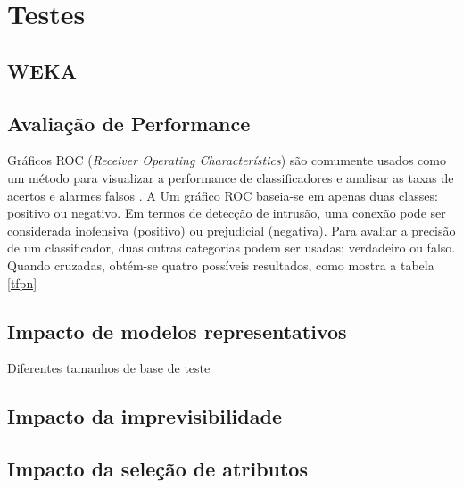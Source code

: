 \chapter{Testes}

\section{WEKA}

\section{Avaliação de Performance}
Gráficos ROC (\textit{Receiver Operating Characterístics}) são comumente usados como um método  para visualizar
a performance de classificadores e analisar as taxas de acertos e alarmes falsos \cite{fawcett04}. A Um gráfico ROC
baseia-se em apenas duas classes: positivo ou negativo. Em termos de detecção de intrusão, uma conexão pode ser
considerada inofensiva (positivo) ou prejudicial (negativa). Para avaliar a precisão de um classificador,
duas outras categorias podem ser usadas: verdadeiro ou falso. Quando cruzadas, obtém-se quatro possíveis resultados,
como mostra a tabela \ref{tfpn}

\section{Impacto de modelos representativos}
Diferentes tamanhos de base de teste

\section{Impacto da imprevisibilidade}

\section{Impacto da seleção de atributos}
